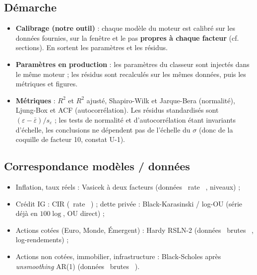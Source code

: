 \documentclass[11pt,a4paper]{article}
\providecommand{\og}{\guillemotleft~}
\providecommand{\fg}{~\guillemotright}
\begin{document}
\subsection{D\'emarche}
\begin{itemize}
  \item \textbf{Calibrage (notre outil)} : chaque mod\`ele du moteur est
        calibr\'e sur les donn\'ees fournies, sur la fen\^etre et le pas \textbf{propres \`a chaque facteur} (cf. sections).
        En sortent les param\`etres et les r\'esidus.
  \item \textbf{Param\`etres en production} : les param\`etres du classeur sont
        inject\'es dans le m\^eme moteur ; les r\'esidus sont recalcul\'es sur les
        m\^emes donn\'ees, puis les m\'etriques et figures.
  \item \textbf{M\'etriques} : $R^2$ et $R^2$ ajust\'e, Shapiro-Wilk et
        Jarque-Bera (normalit\'e), Ljung-Box et ACF (autocorr\'elation). Les
        r\'esidus standardis\'es sont $(\varepsilon-\bar\varepsilon)/s_\varepsilon$ ;
        les tests de normalit\'e et d'autocorr\'elation \'etant invariants
        d'\'echelle, les conclusions ne d\'ependent pas de l'\'echelle du $\sigma$ (donc
        de la coquille de facteur 10, constat U-1).
\end{itemize}

\subsection{Correspondance mod\`eles / donn\'ees}
\begin{itemize}
  \item Inflation, taux r\'eels : Vasicek \`a deux facteurs (donn\'ees \og rate \fg, niveaux) ;
  \item Cr\'edit IG : CIR (\og rate \fg) ; dette priv\'ee : Black-Karasinski / log-OU
        (s\'erie d\'ej\`a en $100\log$, OU direct) ;
  \item Actions cot\'ees (Euro, Monde, \'Emergent) : Hardy RSLN-2 (donn\'ees \og brutes \fg, log-rendements) ;
  \item Actions non cot\'ees, immobilier, infrastructure : Black-Scholes apr\`es
        \emph{unsmoothing} AR(1) (donn\'ees \og brutes \fg).
\end{itemize}
\end{document}
